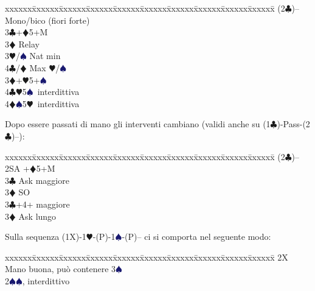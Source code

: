 \documentclass[a4paper,italian]{article}
\newcommand{\BC}{\textcolor{OliveGreen}{$\clubsuit$}}
\newcommand{\BD}{\textcolor{RedOrange}{$\vardiamondsuit$}}
\newcommand{\BH}{\textcolor{Red2}{$\varheartsuit${}}}
\newcommand{\BS}{\textcolor{MidnightBlue}{$\spadesuit${}}}
\newenvironment{bidtable}
{\begin{tabbing}

    xxxxxx\=xxxxxx\=xxxxxx\=xxxxxx\=xxxxxx\=xxxxxx\=xxxxxx\=xxxxxx\=xxxxxx\=xxxxxx\=\kill}
{\end{tabbing} }%
\newenvironment{sviluppi}
{\begin{tcolorbox}[colframe=azzurro,title=Sviluppi particolari]}
    {
\end{tcolorbox} }%
\begin{document}
\begin{multicols}{2}
                                        \begin{bidtable}
                                            (2\BC)-- \> Mono/bico (fiori forte)\+\\
                                            3\BC {}+\BD 5+M\+\\
                                            3\BD \> Relay\+\\
                                            3\BH/\BS \> Nat min\\
                                            4\BC/\BD \> Max \BH /\BS \-\-\\
                                            3\BD {}+\BH 5+\BS \\
                                            4\BC {}\BH 5\BS\ interdittiva\\
                                            4\BD {}\BS 5\BH\ interdittiva\-
                                        \end{bidtable}
                                        \bigbreak
                                        Dopo essere passati di mano gli interventi cambiano (validi anche su (1\BC )-Pass-(2\BC )--):
                                        \bigbreak
                                        \begin{bidtable}
                                            (2\BC)--\+\\
                                            2SA +\BD 5+M\+\\
                                            3\BC \> Ask maggiore\\
                                            3\BD \> SO\-\\
                                            3\BC {}+4+ maggiore\+\\
                                            3\BD \> Ask lungo\-\-
                                        \end{bidtable}
                                        \begin{sviluppi}
                                            Sulla sequenza (1X)-1\BH-(P)-1\BS-(P)-- ci si comporta nel seguente modo:
                                            \begin{bidtable}
                                                2X\> Mano buona, può contenere 3\BS\\
                                                2\BS{}\BS, interdittivo\\

\end{bidtable}
\end{sviluppi}
\end{multicols}
\end{document}
